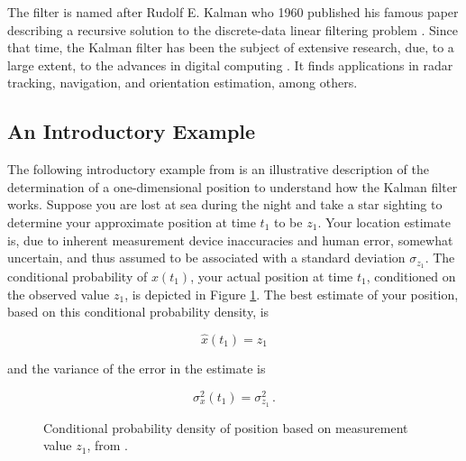 The filter is named after Rudolf E. Kalman who 1960 published his famous paper describing a recursive solution to the discrete-data linear filtering problem \cite{kalman_1960}. Since that time, the Kalman filter has been the subject of extensive research, due, to a large extent, to the advances in digital computing \cite{welch2014}. It finds applications in radar tracking, navigation, and orientation estimation, among others.

\subsection{An Introductory Example}

The following introductory example from \citeauthor{Maybeck79} \cite{Maybeck79} is an illustrative description of the determination of a one-dimensional position to understand how the Kalman filter works. Suppose you are lost at sea during the night and take a star sighting to determine your approximate position at time $t_1$ to be $z_1$. Your location estimate is, due to inherent measurement device inaccuracies and human error, somewhat uncertain, and thus assumed to be associated with a standard deviation $\sigma_{z_1}$. The conditional probability of $x(t_1)$, your actual position at time $t_1$, conditioned on the observed value $z_1$, is depicted in Figure \ref{fig:measurement_z1}. The best estimate of your position, based on this conditional probability density, is

\begin{equation}
  \hat{x}(t_1)=z_1
\end{equation}

\noindent
and the variance of the error in the estimate is

\begin{equation}
  \sigma^2_x(t_1)=\sigma^2_{z_1}\,.
\end{equation}

\begin{figure}
\centering
{}
\caption{Conditional probability density of position based on measurement value $z_1$, from \cite{Maybeck79}.} \label{fig:measurement_z1}
\end{figure}

